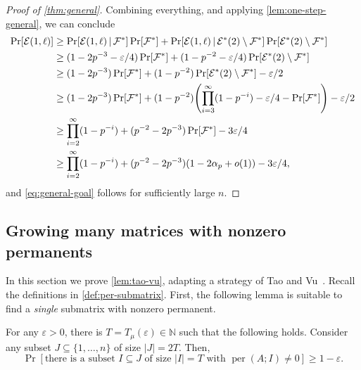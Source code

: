 \documentclass[10pt,reqno]{amsart}
\let\originalleft\left
\let\originalright\right
\renewcommand{\left}{\mathopen{}\mathclose\bgroup\originalleft}
\renewcommand{\right}{\aftergroup\egroup\originalright}
\numberwithin{equation}{section}
\theoremstyle{remark}
\newcommand{\mb}{\mathbb}
\newcommand{\mc}{\mathcal}
\newcommand{\on}{\operatorname}
\begin{document}
\begin{proof}[Proof of \cref{thm:general}]
Combining everything, and applying \cref{lem:one-step-general}, we can conclude
\begin{align*}
    \Pr[\mc E(1,\ell)]&\ge \Pr[\mc E(1,\ell)\,|\,\mc F^*]\Pr[\mc F^*]+\Pr[\mc E(1,\ell)\,|\,\mc E^*(2)\setminus \mc F^*]\Pr[\mc E^*(2)\setminus \mc F^*]\\
   &\ge (1-2p^{-3}-\varepsilon/4)\Pr[\mc F^*]+(1-p^{-2}-\varepsilon/4)\Pr[\mc E^*(2)\setminus \mc F^*]\\
   &\ge (1-2p^{-3})\Pr[\mc F^*]+(1-p^{-2})\Pr[\mc E^*(2)\setminus \mc F^*]-\varepsilon/2\\
   &\ge (1-2p^{-3})\Pr[\mc F^*]+(1-p^{-2})\left(\prod_{i=3}^\infty(1-p^{-i})-\varepsilon/4-\Pr[\mc F^*]\right)-\varepsilon/2\\
   &\ge\prod_{i=2}^\infty(1-p^{-i})+(p^{-2}-2p^{-3})\Pr[\mc F^*]-3\varepsilon/4\\
    &\ge\prod_{i=2}^\infty(1-p^{-i})+(p^{-2}-2p^{-3})(1-2\alpha_p+o(1))-3\varepsilon/4,
\end{align*}
and \cref{eq:general-goal} follows for sufficiently large $n$.
\end{proof}

\subsection{Growing many matrices with nonzero permanents}\label{sec:growth}
In this section we prove \cref{lem:tao-vu}, adapting a strategy of Tao and Vu~\cite{TV09}. Recall the definitions in \cref{def:per-submatrix}. First, the following lemma is suitable to find a \emph{single} submatrix with nonzero permanent.

\begin{lemma}\label{lem:growth}
For any $\varepsilon>0$, there is $T=T_\mu(\varepsilon)\in\mb N$ such that the following
holds. Consider any subset $J\subseteq\{1,\dots,n\}$ of size $|J|=2T$.
Then,
\[
\Pr[\text{there is a}\text{ subset }I\subseteq J\text{ of size }|I|=T\text{ with }\on{per}(A;I)\ne0]\ge 1-\varepsilon.
\]
\end{lemma}
\end{document}
